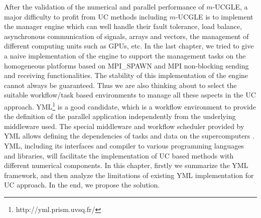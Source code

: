 \begin{displayquote}
	\textsf{After the validation of the numerical and parallel performance of $m$-UCGLE, a major difficulty to profit from UC methods including $m$-UCGLE is to implement the manager engine which can well handle their fault tolerance, load balance, asynchronous communication of signals, arrays and vectors, the management of different computing units such as GPUs, etc. In the last chapter, we tried to give a naive implementation of the engine to support the management tasks on the homogeneous platforms based on MPI\_SPAWN and MPI non-blocking sending and receiving functionalities. The stability of this implementation of the engine cannot always be guaranteed. Thus we are also thinking about to select the suitable workflow/task based environments to manage all these aspects in the UC approach. YML\footnote{http://yml.prism.uvsq.fr/} is a good candidate, which is a workflow environment to provide the definition of the parallel application independently from the underlying middleware used. The special middleware and workflow scheduler provided by YML allows defining the dependencies of tasks and data on the supercomputers \cite{delannoyyml}. YML, including its interfaces and compiler to various programming languages and libraries, will facilitate the implementation of UC based methods with different numerical components. In this chapter, firstly we summarize the YML framework, and then analyze the limitations of existing YML implementation for UC approach. In the end, we propose the solution.}
\end{displayquote}

\vspace{1in}


